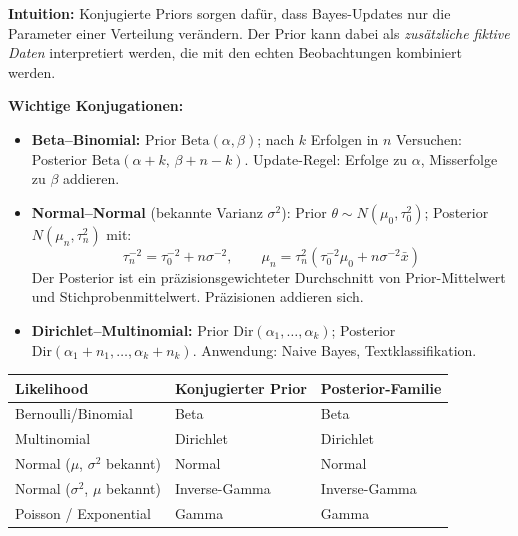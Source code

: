 \textbf{Intuition:} Konjugierte Priors sorgen dafür, dass Bayes-Updates nur die Parameter einer Verteilung verändern. Der Prior kann dabei als \emph{zusätzliche fiktive Daten} interpretiert werden, die mit den echten Beobachtungen kombiniert werden.

\textbf{Wichtige Konjugationen:}
\begin{itemize}[leftmargin=1.5em]
    \item \textbf{Beta--Binomial:} Prior $\text{Beta}(\alpha,\beta)$; nach $k$ Erfolgen in $n$ Versuchen: Posterior $\text{Beta}(\alpha+k,\, \beta+n-k)$. Update-Regel: Erfolge zu $\alpha$, Misserfolge zu $\beta$ addieren.

    \item \textbf{Normal--Normal} (bekannte Varianz $\sigma^2$): Prior $\theta \sim N(\mu_0, \tau_0^2)$; Posterior $N(\mu_n, \tau_n^2)$ mit:
    $$\tau_n^{-2} = \tau_0^{-2} + n\sigma^{-2}, \qquad \mu_n = \tau_n^2\!\left(\tau_0^{-2}\mu_0 + n\sigma^{-2}\bar{x}\right)$$
    Der Posterior ist ein präzisionsgewichteter Durchschnitt von Prior-Mittelwert und Stichprobenmittelwert. Präzisionen addieren sich.

    \item \textbf{Dirichlet--Multinomial:} Prior $\text{Dir}(\alpha_1,\ldots,\alpha_k)$; Posterior $\text{Dir}(\alpha_1+n_1,\ldots,\alpha_k+n_k)$. Anwendung: Naive Bayes, Textklassifikation.
\end{itemize}

\begin{center}
\small
\begin{tabular}{|l|l|l|}
\hline
\textbf{Likelihood} & \textbf{Konjugierter Prior} & \textbf{Posterior-Familie} \\
\hline
Bernoulli/Binomial & Beta & Beta \\
\hline
Multinomial & Dirichlet & Dirichlet \\
\hline
Normal ($\mu$, $\sigma^2$ bekannt) & Normal & Normal \\
\hline
Normal ($\sigma^2$, $\mu$ bekannt) & Inverse-Gamma & Inverse-Gamma \\
\hline
Poisson / Exponential & Gamma & Gamma \\
\hline
\end{tabular}
\end{center}


